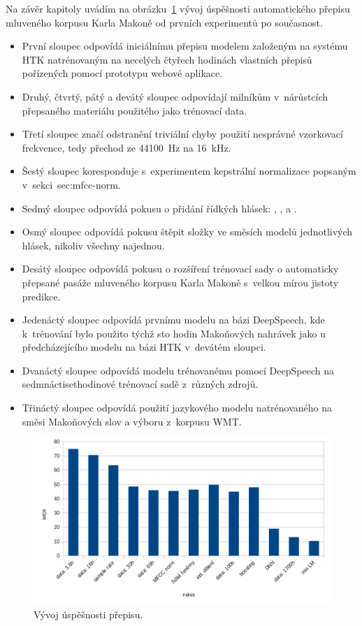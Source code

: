 Na závěr kapitoly uvádím na obrázku~\ref{fig:asrhist} vývoj úspěšnosti
automatického přepisu mluveného korpusu Karla Makoně od prvních experimentů po
současnost.
\begin{itemize}
\item{
  První sloupec odpovídá iniciálnímu přepisu modelem založeným na
systému HTK natrénovaným na necelých čtyřech hodinách vlastních přepisů
pořízených pomocí prototypu webové aplikace.
}
\item{
  Druhý, čtvrtý, pátý a devátý sloupec odpovídají milníkům v~nárůstcích
  přepsaného materiálu použitého jako trénovací data.
}
\item{
  Třetí sloupec značí odstranění triviální chyby použití nesprávné
  vzorkovací frekvence, tedy přechod ze 44100~Hz na 16~kHz.
}
\item{
  Šestý sloupec koresponduje s~experimentem kepstrální normalizace popsaným
  v~sekci~{sec:mfcc-norm}.
}
\item{
  Sedmý sloupec odpovídá pokusu o přidání řídkých hlásek:
  , ,  a .
}
\item{
  Osmý sloupec odpovídá pokusu štěpit složky ve směsích modelů jednotlivých
  hlásek, nikoliv všechny najednou.
}
\item{
  Desátý sloupec odpovídá pokusu o rozšíření trénovací sady o automaticky
  přepsané pasáže mluveného korpusu Karla Makoně s~velkou mírou jistoty
  predikce.
}
\item{
  Jedenáctý sloupec odpovídá prvnímu modelu na bázi DeepSpeech, kde k~trénování
  bylo použito týchž sto hodin Makoňových nahrávek jako u předcházejícího modelu
  na bázi HTK v~devátém sloupci.
}
\item{
  Dvanáctý sloupec odpovídá modelu trénovanému pomocí DeepSpeech na
  sedmnáctisethodinové trénovací sadě z~různých zdrojů.
}
\item{
  Třináctý sloupec odpovídá použití jazykového modelu natrénovaného na směsi
  Makoňových slov a výboru z~korpusu WMT.
}
\end{itemize}

\begin{figure}[htpb]
\includegraphics[scale=0.43]{rc/asrhist.png}
\caption{
    Vývoj úspěšnosti přepisu.
}
\label{fig:asrhist}
\end{figure}

